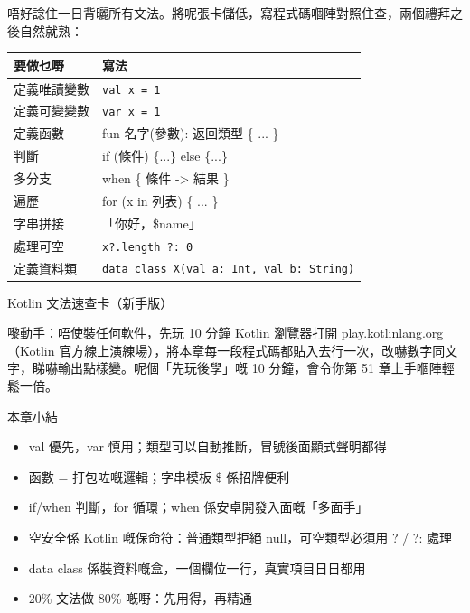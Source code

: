
唔好諗住一日背曬所有文法。將呢張卡儲低，寫程式碼嗰陣對照住查，兩個禮拜之後自然就熟：

\begin{center}
\begin{tabularx}{\linewidth}{|X|X|}
\hline
\textbf{要做乜嘢} & \textbf{寫法} \tabularnewline
\hline
定義唯讀變數 & \texttt{val x = 1} \tabularnewline
定義可變變數 & \texttt{var x = 1} \tabularnewline
定義函數 & fun 名字(參數): 返回類型 \{ ... \} \tabularnewline
判斷 & if (條件) \{...\} else \{...\} \tabularnewline
多分支 & when \{ 條件 -> 結果 \} \tabularnewline
遍歷 & for (x in 列表) \{ ... \} \tabularnewline
字串拼接 & 「你好，\$name」 \tabularnewline
處理可空 & \texttt{x?.\allowbreak length ?: 0} \tabularnewline
定義資料類 & \texttt{data class X(val a: Int, val b: String)} \tabularnewline
\hline
\end{tabularx}
\end{center}

\begin{center}\small\color{gray}Kotlin 文法速查卡（新手版）\end{center}

\begin{tcbpractice}{嚟動手：唔使裝任何軟件，先玩 10 分鐘 Kotlin}
瀏覽器打開 play.kotlinlang.org（Kotlin 官方線上演練場），將本章每一段程式碼都貼入去行一次，改嚇數字同文字，睇嚇輸出點樣變。呢個「先玩後學」嘅 10 分鐘，會令你第 51 章上手嗰陣輕鬆一倍。

\end{tcbpractice}

\begin{tcbsummary}{本章小結}
\begin{itemize}
  \item val 優先，var 慎用；類型可以自動推斷，冒號後面顯式聲明都得
  \item 函數 = 打包咗嘅邏輯；字串模板 \$ 係招牌便利
  \item if/when 判斷，for 循環；when 係安卓開發入面嘅「多面手」
  \item 空安全係 Kotlin 嘅保命符：普通類型拒絕 null，可空類型必須用 ? / ?: 處理
  \item data class 係裝資料嘅盒，一個欄位一行，真實項目日日都用
  \item 20\% 文法做 80\% 嘅嘢：先用得，再精通
\end{itemize}

\end{tcbsummary}
